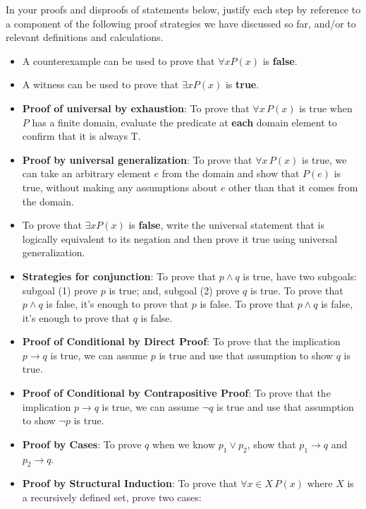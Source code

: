 \instructions

In your proofs and disproofs of statements below, justify each  step
by reference to  a component of the  following proof  strategies
we  have discussed so far, and/or to relevant definitions and calculations.

\vspace{-10pt}

\begin{itemize}
    \item A counterexample can be used to prove that  $\forall x P(x)$ is {\bf false}.
    \item  A witness can be used  to  prove that  $\exists x P(x)$ is {\bf true}.
    \item {\bf Proof of universal by exhaustion}: To prove that $\forall x \, P(x)$
is true when $P$ has a finite domain, evaluate the predicate at {\bf each} domain element to confirm that it is always T.
    \item  {\bf Proof by universal generalization}: To prove that $\forall x \, P(x)$
is true, we can take an arbitrary element $e$ from the domain and show that $P(e)$ is true, without making any assumptions about $e$ other than that it comes from the domain.
    \item To  prove  that $\exists x P(x)$ is {\bf false}, write the universal statement that is logically equivalent to its negation and then prove it true using universal generalization.
    
\newpage
    \item {\bf Strategies for conjunction}: To prove that $p \land q$ is true, have two subgoals: subgoal (1) prove $p$ 
is  true; and, subgoal (2) prove $q$ is true. To prove that $p \land q$ is false, it's enough to prove that $p$ is false.
 To prove that $p \land q$ is false, it's enough to prove that $q$ is false.
    \item {\bf Proof of Conditional by Direct Proof}: To prove that the implication $p \to q$ is true, we can assume $p$ is true and use that assumption to show $q$ is true.
    \item {\bf Proof of Conditional by Contrapositive Proof}: To prove that the implication $p \to q$ is true, we can assume $\neg q$ is true and use that assumption to show $\neg p$ is true.
    \item {\bf Proof by Cases}: To prove $q$ when we know $p_1 \lor p_2$, show that $p_1 \to q$ and $p_2 \to q$.
    \item  
    {\bf Proof by Structural Induction}: To prove that $\forall x \in X \, P(x)$ where $X$ is a recursively defined set, prove two cases:
        

\end{itemize}
